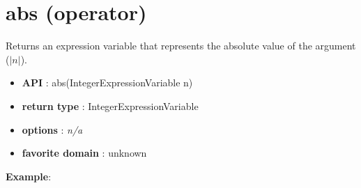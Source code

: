 \section{abs (operator)}\label{abs:absoperator}\hypertarget{abs:absoperator}{}
Returns an expression variable that represents the absolute value of the argument (\(|n|\)).

\begin{itemize}
	\item \textbf{API} : abs(IntegerExpressionVariable n)
	\item \textbf{return type} : IntegerExpressionVariable
	\item \textbf{options} : \emph{n/a}
	\item \textbf{favorite domain} : unknown
\end{itemize}

\textbf{Example}:


